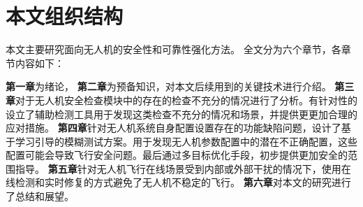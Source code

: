 
    
  
\section{本文组织结构}
本文主要研究面向无人机的安全性和可靠性强化方法。
全文分为六个章节，各章节内容如下：

\textbf{第一章}为绪论，
\textbf{第二章}为预备知识，对本文后续用到的关键技术进行介绍。
\textbf{第三章}对于无人机安全检查模块中的存在的检查不充分的情况进行了分析。有针对性的设立了辅助检测工具用于发现这类检查不充分的情况和场景，并提供更更加合理的应对措施。
\textbf{第四章}针对无人机系统自身配置设置存在的功能缺陷问题，设计了基于学习引导的模糊测试方案。用于发现无人机参数配置中的潜在不正确配置，这些配置可能会导致飞行安全问题。最后通过多目标优化手段，初步提供更加安全的范围指导。
\textbf{第五章}针对无人机飞行在线场景受到内部或外部干扰的情况下，使用在线检测和实时修复的方式避免了无人机不稳定的飞行。
\textbf{第六章}对本文的研究进行了总结和展望。